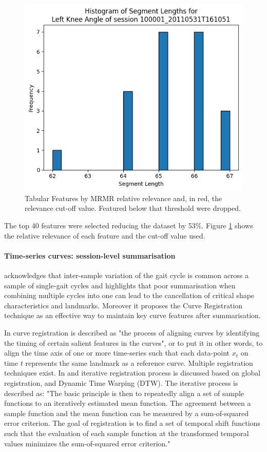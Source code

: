 \begin{figure}[ht]
    \centering
    \includegraphics[width=0.5\columnwidth]{images/hist_segment_lengths_L_knee_angle.png}
    \caption[Tabular Features by MRMR relative relevance]{Tabular Features by MRMR relative relevance and, in red, the relevance cut-off value. Featured below that threshold were dropped.\label{fig:met-mrm-feat-sel}}
\end{figure}

The top 40 features were selected reducing the dataset by 53\%. Figure \ref{fig:met-mrm-feat-sel} shows the relative relevance of each feature and the cut-off value used.

\paragraph{Time-series curves: session-level summarisation}
\citet{Chau2005} acknowledges that inter-sample variation of the gait cycle is common across a sample of single-gait cycles and highlights that poor summarisation when combining multiple cycles into one can lead to the cancellation of critical shape characteristics and landmarks. Moreover it proposes the Curve Registration technique \citep{Ramsay1998} as an effective way to maintain key curve features after summarisation.

In \citet{Ramsay1998} curve registration is described as "the process of aligning curves by identifying the timing of certain salient features in the curves", or to put it in other words, to align the time axis of one or more time-series such that each data-point $x_t$ on time $t$ represents the same landmark as a reference curve. Multiple registration techniques exist. In \citet{Chau2005} and iterative registration process is discussed based on global registration, and Dynamic Time Warping (DTW). The iterative process is described as: "The basic principle is then to repeatedly align a set of sample functions to an iteratively estimated mean function. The agreement between a sample function and the mean function can be measured by a sum-of-squared error criterion. The goal of registration is to find a set of temporal shift functions such that the evaluation of each sample function at the transformed temporal values minimizes the sum-of-squared error criterion."

